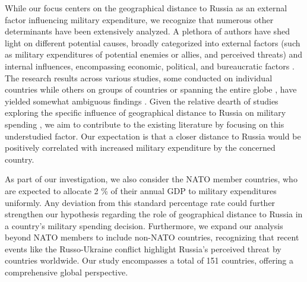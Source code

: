 \documentclass[12pt,a4paper]{article}
\begin{document}
While our focus centers on the geographical distance to Russia as an external factor influencing military expenditure, we recognize that numerous other determinants have been extensively analyzed. A plethora of authors have shed light on different potential causes, broadly categorized into external factors (such as military expenditures of potential enemies or allies, and perceived threats) and internal influences, encompassing economic, political, and bureaucratic factors \citep{nikolaidou2008}. The research results across various studies, some conducted on individual countries while others on groups of countries or spanning the entire globe \citep{nikolaidou2008,george2018,nordhaus2012}, have yielded somewhat ambiguous findings \citep{nikolaidou2008,odehnal2020}. 
Given the relative dearth of studies exploring the specific influence of geographical distance to Russia on military spending \citep{kofrovn2023}, we aim to contribute to the existing literature by focusing on this understudied factor. Our expectation is that a closer distance to Russia would be positively correlated with increased military expenditure by the concerned country.  

As part of our investigation, we also consider the NATO member countries, who are expected to allocate 2 \% of their annual GDP to military expenditures uniformly. Any deviation from this standard percentage rate could further strengthen our hypothesis regarding the role of geographical distance to Russia in a country's military spending decision. Furthermore, we expand our analysis beyond NATO members to include non-NATO countries, recognizing that recent events like the Russo-Ukraine conflict highlight Russia's perceived threat by countries worldwide. Our study encompasses a total of 151 countries, offering a comprehensive global perspective. 
\end{document}
